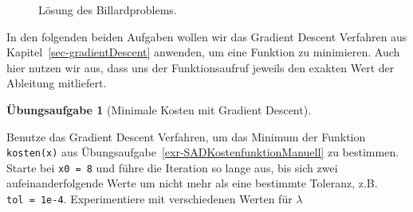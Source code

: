 \documentclass[
  a4paper,
  DIV=11]{scrreprt}
\theoremstyle{definition}
\newtheorem{exercise}{Übungsaufgabe}[chapter]
\theoremstyle{definition}
\theoremstyle{remark}
\begin{document}
\begin{tcolorbox}
\begin{figure}[H]
{}

\caption{\label{fig-billardproblemsolution}Lösung des Billardproblems.}

\end{figure}

\end{tcolorbox}

In den folgenden beiden Aufgaben wollen wir das Gradient Descent
Verfahren aus Kapitel~\ref{sec-gradientDescent} anwenden, um eine
Funktion zu minimieren. Auch hier nutzen wir aus, dass uns der
Funktionsaufruf jeweils den exakten Wert der Ableitung mitliefert.

\begin{exercise}[Minimale Kosten mit Gradient
Descent]\protect\hypertarget{exr-MinKosten}{}\label{exr-MinKosten}

Benutze das Gradient Descent Verfahren, um das Minimum der Funktion
\texttt{kosten(x)} aus Übungsaufgabe~\ref{exr-SADKostenfunktionManuell}
zu bestimmen. Starte bei \texttt{x0\ =\ 8} und führe die Iteration so
lange aus, bis sich zwei aufeinanderfolgende Werte um nicht mehr als
eine bestimmte Toleranz, z.B. \texttt{tol\ =\ 1e-4}. Experimentiere mit
verschiedenen Werten für \(\lambda\)

\end{exercise}
\end{document}
